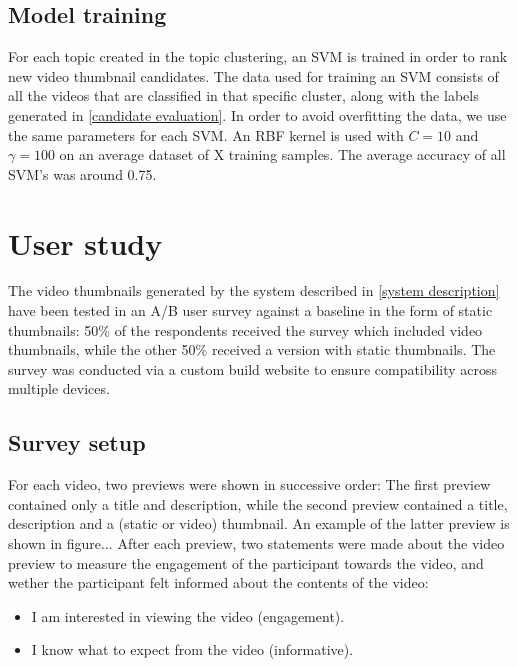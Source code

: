 \documentclass{../resources/acm_proc_article-sp}
\begin{document}
\subsection{Model training}


For each topic created in the topic clustering, an SVM is trained in order to rank new video thumbnail candidates. The data used for training an SVM consists of all the videos that are classified in that specific cluster, along with the labels generated in \ref{candidate evaluation}. In order to avoid overfitting the data, we use the same parameters for each SVM. An RBF kernel is used with $C = 10$ and $\gamma = 100$ on an average dataset of X training samples. The average accuracy of all SVM's was around 0.75.



\section{User study}
The video thumbnails generated by the system described in \ref{system description} have been tested in an A/B user survey against a baseline in the form of static thumbnails: 50\% of the respondents received the survey which included video thumbnails, while the other 50\% received a version with static thumbnails. The survey was conducted via a custom build website to ensure compatibility across multiple devices.

\subsection{Survey setup}

For each video, two previews were shown in successive order: The first preview contained only a title and description, while the second preview contained a title, description and a (static or video) thumbnail. An example of the latter preview is shown in figure... 
After each preview, two statements were made about the video preview to measure the engagement of the participant towards the video, and wether the participant felt informed about the contents of the video:

\begin{itemize}
	\item I am interested in viewing the video (engagement).
	\item I know what to expect from the video (informative).
\end{itemize}
\end{document}
